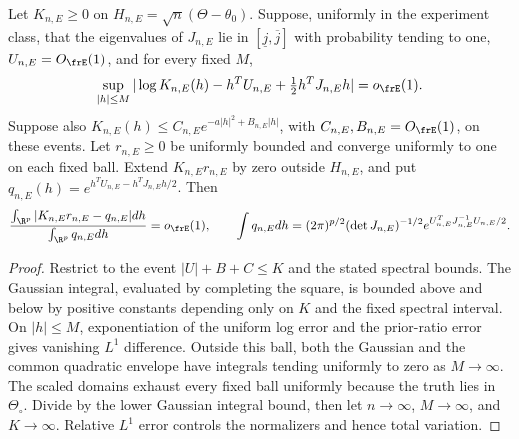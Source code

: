 \begin{lemma}
\label{lem:random-laplace}
Let \(K_{n,E}\ge0\) on \(H_{n,E}=\sqrt n(\Theta-\theta_0)\).
Suppose, uniformly in the experiment class, that the eigenvalues of
\(J_{n,E}\) lie in \([\underline j,\overline j]\) with probability tending
to one, \(U_{n,E}=O_{\frE}(1)\), and for every fixed \(M\),
\[
 \sup_{|h|\le M}|\log K_{n,E}(h)-h^TU_{n,E}+\tfrac12h^TJ_{n,E}h|
 =o_{\frE}(1).
\]
Suppose also \(K_{n,E}(h)\le C_{n,E}e^{-a|h|^2+B_{n,E}|h|}\), with
\(C_{n,E},B_{n,E}=O_{\frE}(1)\), on these events. Let \(r_{n,E}\ge0\)
be uniformly bounded and converge uniformly to one on each fixed ball.
Extend \(K_{n,E}r_{n,E}\) by zero outside \(H_{n,E}\), and put
\(q_{n,E}(h)=e^{h^TU_{n,E}-h^TJ_{n,E}h/2}\). Then
\begin{equation}
 \frac{\int_{\R^p}|K_{n,E}r_{n,E}-q_{n,E}|dh}{\int_{\R^p}q_{n,E}dh}
 =o_{\frE}(1),\qquad
 \int q_{n,E}dh=(2\pi)^{p/2}(\det J_{n,E})^{-1/2}
 e^{U_{n,E}^TJ_{n,E}^{-1}U_{n,E}/2}.
 \label{eq:relative-L1}
\end{equation}
\end{lemma}
\begin{proof}
Restrict to the event \(|U|+B+C\le K\) and the stated spectral bounds.
The Gaussian integral, evaluated by completing the square, is bounded
above and below by positive constants depending only on \(K\) and the
fixed spectral interval. On \(|h|\le M\), exponentiation of the uniform
log error and the prior-ratio error gives vanishing \(L^1\) difference.
Outside this ball, both the Gaussian and the common quadratic envelope
have integrals tending uniformly to zero as \(M\to\infty\).
The scaled domains exhaust every fixed ball uniformly because the truth
lies in \(\Theta_\circ\). Divide by the lower Gaussian integral bound,
then let \(n\to\infty\), \(M\to\infty\), and \(K\to\infty\).
Relative \(L^1\) error controls the normalizers and hence total variation.
\end{proof}

